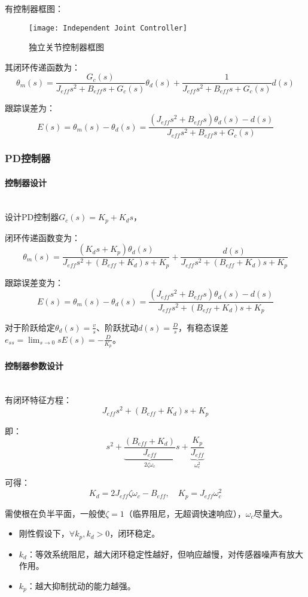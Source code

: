 \documentclass[
12pt, %
a4paper, 
oneside, %
headinclude,footinclude, %
]{scrartcl}
\begin{document}
有控制器框图：
\begin{figure}[H]
\centering 
\texttt{[image: Independent Joint Controller]} 
\caption{独立关节控制器框图}
\end{figure}

其闭环传递函数为：
$$ \theta_m(s) = \frac{G_c(s)}{J_{eff}s^2 + B_{eff}s + G_c(s)}\theta_d(s) + \frac{1}{J_{eff}s^2 + B_{eff}s + G_c(s)}d(s) $$

跟踪误差为：
$$ E(s) = \theta_m(s) - \theta_d(s) = \frac{(J_{eff}s^2 + B_{eff}s)\theta_d(s) - d(s)}{J_{eff}s^2 + B_{eff}s + G_c(s)} $$
\subsubsection[PD控制器]{PD控制器}
\paragraph{控制器设计}~\\

设计PD控制器$ G_c(s) = K_p + K_d s $，

闭环传递函数变为：
$$ \theta_m(s) = \frac{(K_d s + K_p)\theta_d(s)}{J_{eff}s^2 + (B_{eff} + K_d)s + K_p} + \frac{d(s)}{J_{eff}s^2 + (B_{eff} + K_d)s + K_p} $$

跟踪误差变为：
$$ E(s) = \theta_m(s) - \theta_d(s) = \frac{(J_{eff}s^2 + B_{eff}s)\theta_d(s) - d(s)}{J_{eff}s^2 + (B_{eff} + K_d)s + K_p} $$

对于阶跃给定$ \theta_d(s) = \frac{v}{s} $、阶跃扰动$ d(s) = \frac{D}{s} $，有稳态误差$ e_{ss} = \lim_{s \to 0} s E(s) = -\frac{D}{K_p} $。
\paragraph{控制器参数设计}~\\

有闭环特征方程：
$$ J_{eff}s^2 + (B_{eff} + K_d)s + K_p $$

即：
$$ s^2 + \underbrace{\frac{(B_{eff} + K_d)}{J_{eff}}}_{2\zeta \omega_c}s + \underbrace{\frac{K_p}{J_{eff}}}_{\omega_c^2} $$

可得：
$$ K_d = 2J_{eff}\zeta\omega_c - B_{eff}, \quad K_p = J_{eff}\omega_c^2 $$

需使根在负半平面，一般使$ \zeta = 1 $（临界阻尼，无超调快速响应），$ \omega_c $尽量大。
\begin{itemize}
\item 刚性假设下，$ \forall k_p, k_d > 0 $，闭环稳定。
\item $ k_d $：等效系统阻尼，越大闭环稳定性越好，但响应越慢，对传感器噪声有放大作用。
\item $ k_p $：越大抑制扰动的能力越强。
\end{itemize}
\end{document}
